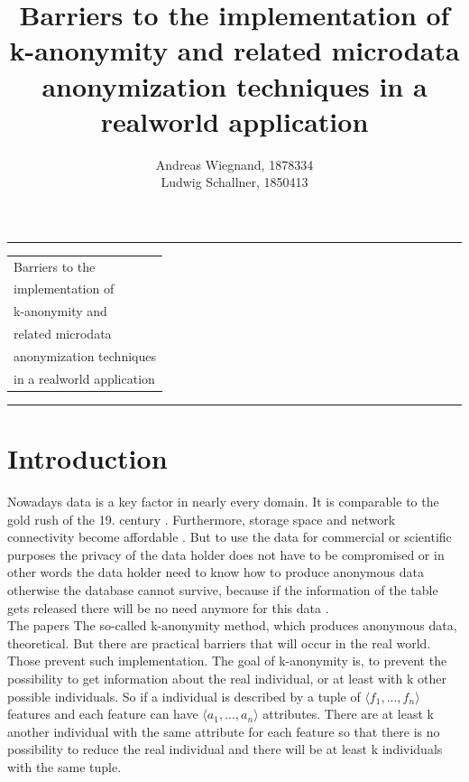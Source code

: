 \documentclass{llncs}
\begin{document}
\thispagestyle{empty}
\rule{\textwidth}{1pt}
\vspace{2pt}
\begin{flushright}
\Huge
\begin{tabular}{@{}l}
Barriers to the\\
implementation of\\
k-anonymity and\\
related microdata\\
anonymization techniques\\
in a realworld application\\[6pt]

\end{tabular}
\end{flushright}
\rule{\textwidth}{1pt}
\vfill
\title{Barriers to the implementation of k-anonymity and related microdata anonymization techniques in a realworld application}
\author{Andreas Wiegnand, 1878334\\
	Ludwig Schallner, 1850413}
\institute{}
\maketitle
%
\newpage
\setcounter{page}{1}
\section{Introduction}
%
Nowadays data is a key factor in nearly every domain. It is comparable to the gold rush of the 19. century \cite{datarevo}. Furthermore, storage space and network connectivity become affordable \cite{sweeney2002k}. But to use the data for commercial or scientific purposes the privacy of the data holder does not have to be compromised or in other words the data holder need to know how to produce anonymous data otherwise the database cannot survive, because if the information of the table gets released there will be no need anymore for this data \cite{sweeney2002k}.\\

The papers The so-called k-anonymity method, which produces anonymous data, theoretical. But there are practical barriers that will occur in the real world. Those prevent such implementation. The goal of k-anonymity is, to prevent the possibility to get information about the real individual, or at least with k other possible individuals. So if a individual is described by a tuple of \ensuremath{\langle f_1, ... ,f_n \rangle} features and each feature can have \ensuremath{\langle a_1,...,a_n \rangle} attributes. There are at least k another individual with the same attribute for each feature so that there is no possibility to reduce the real individual and there will be at least k individuals with the same tuple\cite{sweeney2002k}.\\
\end{document}
